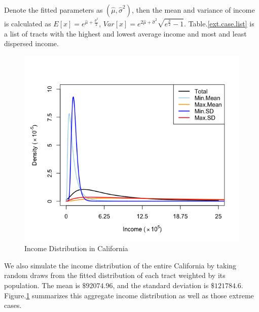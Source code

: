 \documentclass{article}
\begin{document}
Denote the fitted parameters as $(\hat{\mu}, \hat{\sigma}^2)$, then the mean and variance of income is calculated as $E[x] = e^{\hat{\mu} +\frac{\hat{\sigma}^2}{2}}$, $Var[x] = e^{2\hat{\mu} +\hat{\sigma}^2}\sqrt{e^{\frac{\hat{\sigma}}{2} } - 1}$. Table.\ref{ext.case.list} is a list of tracts with the highest and lowest average income and most and least dispersed income.


\begin{figure}[h]
	\centering
	\includegraphics[scale=0.5]{"CA Income Distribution_q&ex_w"}
	\caption{Income Distribution in California}
	\label{inc.dist}
\end{figure}


We also simulate the income distribution of the entire California by taking random draws from the fitted distribution of each tract weighted by its population. The mean is $\$92074.96$, and the standard deviation is $\$121784.6$. Figure.\ref{inc.dist} summarizes this aggregate income distribution as well as those extreme cases.
\end{document}
